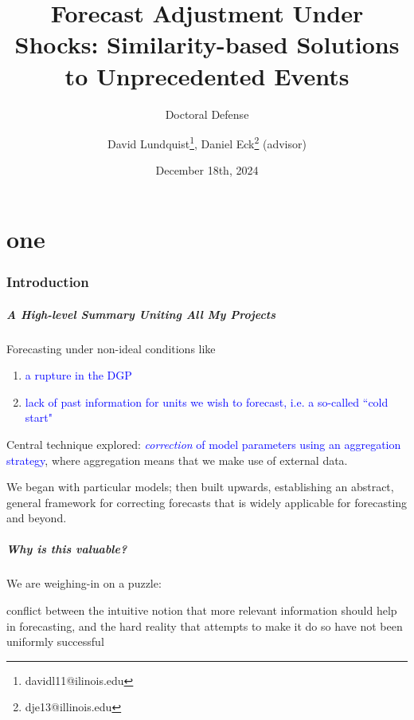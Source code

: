 \documentclass[9pt]{beamer}
\title{Forecast Adjustment Under Shocks: Similarity-based Solutions to Unprecedented Events}
\subtitle{Doctoral Defense}
\author{David Lundquist\thanks{davidl11@ilinois.edu}, Daniel Eck\thanks{dje13@illinois.edu} (advisor)}
\date{December 18th, 2024}
\theoremstyle{definition}
\begin{document}
\part{one}
\begin{frame}
\titlepage
\end{frame}

\section{Introduction}

\begin{frame}
    \frametitle{A High-level Summary Uniting All My Projects}
    
        Forecasting under non-ideal conditions like 

        \begin{enumerate}
            \item \textcolor{blue}{a rupture in the DGP}
            \item  \textcolor{blue}{lack of past information for units we wish to forecast, i.e. a so-called ``cold start"} \parencite{fatemi2023mitigating}
        \end{enumerate}

        \bigskip

        Central technique explored: \textcolor{blue}{\textit{correction} of model parameters using an aggregation strategy}, where aggregation means that we make use of external data.


        \bigskip

        We began with particular models; then built upwards, establishing an abstract, general framework for correcting forecasts that is widely applicable for forecasting and beyond.

\end{frame}

    \begin{frame}
        \frametitle{Why is this valuable?}
        
            We are weighing-in on a puzzle:

            \begin{myquote}[colback=red!30, size=small]
                conflict between the intuitive notion that more relevant information should help in forecasting, and the hard reality that attempts to make it do so have not been uniformly successful \parencite[][]{clements2005guest}
            \end{myquote}

    \end{frame}
\end{document}
